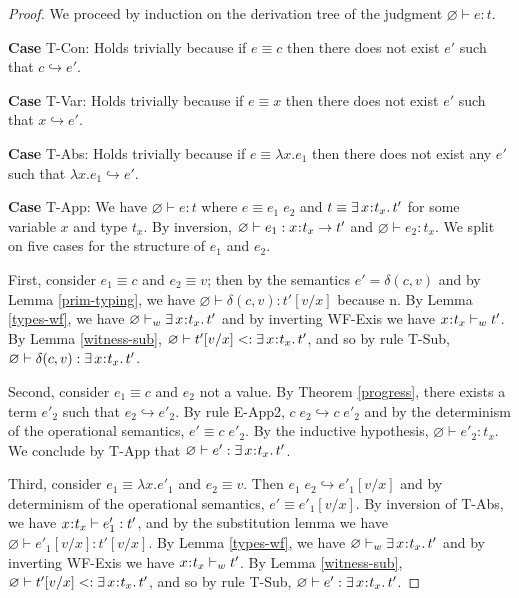 \documentclass[11pt]{article}
\newcommand{\bind}{\hspace{0.05em}{:}\hspace{0.05em}} %
\newcommand{\step}{\hookrightarrow}
\newcommand{\existype}[3]{\exists\, #1\bind #2.\, #3}
\newcommand{\functype}[3]{#1\bind #2 \rightarrow #3}
\begin{document}
\begin{proof} We proceed by induction on the derivation tree of the judgment $\varnothing \vdash e : t$.

{\bf Case} {\sc T-Con}: Holds trivially because if $e \equiv c$ then there does not exist $e'$ such that $c \hookrightarrow e'$.

{\bf Case} {\sc T-Var}: Holds trivially because if $e \equiv x$ then there does not exist $e'$ such that $x \hookrightarrow e'$.

{\bf Case} {\sc T-Abs}: Holds trivially because if $e \equiv \lambda x.e_1$ then there does not exist any $e'$ such that $\lambda x.e_1 \hookrightarrow e'$.

{\bf Case} {\sc T-App}: We have $\varnothing \vdash e : t$ where $e \equiv e_1\; e_2$ and $t \equiv \existype{x}{t_x}{t'}$ for some variable $x$ and type $t_x$. By inversion, $\varnothing \vdash e_1 : \functype{x}{t_x}{t'}$ and $\varnothing \vdash e_2 : t_x$. We split on five cases for the structure of $e_1$ and $e_2$.

First, consider $e_1 \equiv c$ and $e_2 \equiv v$; then by the semantics $e' = \delta(c,v)$ and by Lemma \ref{prim-typing}, we have $\varnothing \vdash \delta(c,v) : t'[v/x]$ because n. By Lemma \ref{types-wf}, we have $\varnothing \vdash_w \existype{x}{t_x}{t'}$ and by inverting {\sc WF-Exis} we have $x\bind t_x \vdash_w t'$. By Lemma \ref{witness-sub}, $\varnothing \vdash t'[v/x] <: \existype{x}{t_x}{t'}$, and so by rule {\sc T-Sub}, $\varnothing \vdash \delta(c,v) : \existype{x}{t_x}{t'} $.

Second, consider $e_1 \equiv c$ and $e_2$ not a value. By Theorem \ref{progress}, there exists a term $e'_2$ such that $e_2 \step e'_2$. By rule {\sc E-App2}, $c\; e_2 \step c\; e'_2$ and by the determinism of the operational semantics, $e' \equiv c\; e'_2$.
By the inductive hypothesis, $\varnothing \vdash e'_2 : t_x$. We conclude by {\sc T-App} that $\varnothing \vdash e' : \existype{x}{t_x}{t'}$.

Third, consider $e_1 \equiv \lambda x.e'_1$ and $e_2 \equiv v$. Then $e_1\; e_2 \step e'_1[v/x]$ and by determinism of the operational semantics, $e' \equiv e'_1[v/x]$. By inversion of {\sc T-Abs}, we have $x\bind t_x \vdash e'_1 : t'$, and by the substitution lemma we have $\varnothing \vdash e'_1[v/x] : t'[v/x]$. By Lemma \ref{types-wf}, we have $\varnothing \vdash_w \existype{x}{t_x}{t'}$ and by inverting {\sc WF-Exis} we have $x\bind t_x \vdash_w t'$. By Lemma \ref{witness-sub}, $\varnothing \vdash t'[v/x] <: \existype{x}{t_x}{t'}$, and so by rule {\sc T-Sub}, $\varnothing \vdash e' : \existype{x}{t_x}{t'}$.


\end{proof}
\end{document}
